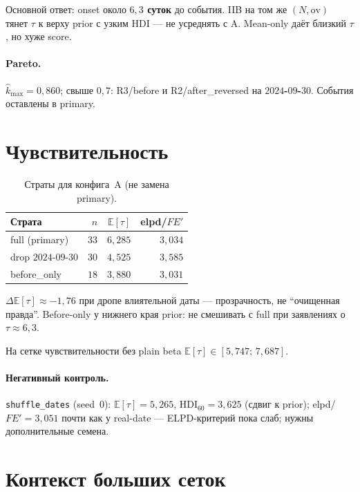 \documentclass{article}
\begin{document}
Основной ответ: onset около \textbf{$6{,}3$ суток} до события.
IIB на том же $(N,\mathrm{ov})$ тянет $\tau$ к верху prior с узким
HDI --- не усреднять с A. Mean-only даёт близкий $\tau$, но хуже
score.

\paragraph{Pareto.}
$\hat k_{\max}{=}0{,}860$; свыше $0{,}7$: R3/before и
R2/after\_reversed на \textbf{$2024$-$09$-$30$}. События оставлены
в primary.

\section{Чувствительность}

\begin{table}[t]
\centering
\caption{Страты для конфига~A (не замена primary).}
\label{tab:sens-a}
\small
\begin{tabular}{lrrr}
\toprule
Страта & $n$ & $\mathbb{E}[\tau]$ & elpd/$FE'$\\
\midrule
full (primary) & $33$ & $6{,}285$ & $3{,}034$\\
drop $2024$-$09$-$30$ & $30$ & $4{,}525$ & $3{,}585$\\
before\_only & $18$ & $3{,}880$ & $3{,}031$\\
\bottomrule
\end{tabular}
\end{table}

$\Delta\mathbb{E}[\tau]\approx -1{,}76$ при дропе влиятельной даты ---
прозрачность, не ``очищенная правда''. Before-only у нижнего края
prior: не смешивать с full при заявлениях о $\tau\approx 6{,}3$.

На сетке чувствительности без plain beta
$\mathbb{E}[\tau]\in[5{,}747;\,7{,}687]$.

\paragraph{Негативный контроль.}
\texttt{shuffle\_dates} (seed~$0$): $\mathbb{E}[\tau]{=}5{,}265$,
HDI$_{60}{=}3{,}625$ (сдвиг к prior); elpd/$FE'{=}3{,}051$ почти как
у real-date --- ELPD-критерий пока слаб; нужны дополнительные семена.

\section{Контекст больших сеток}
\end{document}

